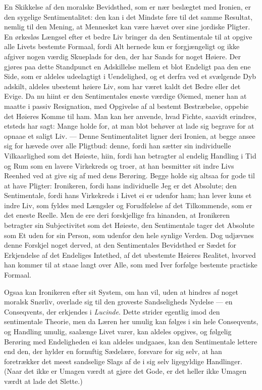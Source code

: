 \documentclass[12pt]{article}
\newcommand{\opage}[1]{\marginnote{\footnotesize\textit{[#1]}}}
\begin{document}
En Skikkelse af den moralske Bevidsthed, som er nær be\opage{157}slægtet med Ironien, er den sygelige Sentimentalitet: den kan i det Mindste føre til det samme Resultat, nemlig til den Mening, at Mennesket kan være hævet over sine jordiske Pligter. En ørkesløs Længsel efter et bedre Liv bringer da den Sentimentale til at opgive alle Livets bestemte Formaal, fordi Alt hernede kun er forgjængeligt og ikke afgiver nogen værdig Skueplads for den, der har Sands for noget Høiere. Der gjøres paa dette Standpunct en Adskillelse mellem et blot Endeligt paa den ene Side, som er aldeles udeelagtigt i Uendelighed, og et derfra ved et svælgende Dyb adskilt, aldeles ubestemt høiere Liv, som har været kaldt det Bedre eller det Evige. Da nu hiint er den Sentimentales eneste værdige Øiemed, mener han at maatte i passiv Resignation, med Opgivelse af al bestemt Bestræbelse, oppebie det Høieres Komme til ham. Man kan her anvende, hvad Fichte, saavidt erindres, etsteds har sagt: Mange holde for, at man blot behøver at lade sig begrave for at opnaae et saligt Liv. --- Denne Sentimentalitet ligner deri Ironien, at begge ansee sig for hævede over alle Pligtbud: denne, fordi han sætter sin individuelle Vilkaarlighed som det Høieste, hiin, fordi han betragter al endelig Handling i Tid og Rum som en lavere Virkekreds og troer, at han besmitter sit indre Livs Reenhed ved at give sig af med dens Berøring. Begge holde sig altsaa for gode til at have Pligter: Ironikeren, fordi hans individuelle Jeg er det Absolute; den Sentimentale, fordi hans Virkekreds i Livet ei er udenfor ham; han lever kuns et indre Liv, som fyldes med Længsler og Forudfølelse af det Tilkommende, som er det eneste Reelle. Men de ere deri forskjellige fra hinanden, at Ironikeren betragter sin Subjectivitet som det Høieste, den Sentimentale tager det Absolute som Et uden for sin Person, som udenfor den hele synlige Verden. Dog udjævnes denne Forskjel noget derved, at den Sentimentales Bevidsthed er Sædet for Erkjendelse af det Endeliges Intethed, af det ubestemte Høieres Realitet, hvorved han \opage{158}kommer til at staae langt over Alle, som med Iver forfølge bestemte practiske Formaal.

Ogsaa kan Ironikeren efter sit System, om han vil, uden at hindres af noget moralsk Snørliv, overlade sig til den groveste Sandseligheds Nydelse --- en Conseqvents, der erkjendes i \emph{Lucinde}. Dette strider egentlig imod den sentimentale Theorie, men da Læren her umulig kan følges i sin hele Conseqvents, og Handling umulig, saalænge Livet varer, kan aldeles opgives, og følgelig Berøring med Endeligheden ei kan aldeles undgaaes, kan den Sentimentale lettere end den, der hylder en fornuftig Sædelære, forsvare for sig selv, at han foretrækker det meest sandselige Slags af de i sig selv ligegyldige Handlinger. (Naar det ikke er Umagen værdt at gjøre det Gode, er det heller ikke Umagen værdt at lade det Slette.)
\end{document}
